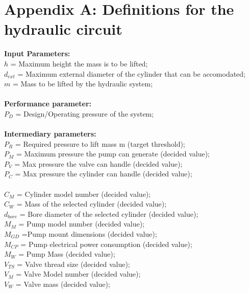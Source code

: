 
\footnotesize

\normalsize

\section*{Appendix A: Definitions for the hydraulic circuit}

\textbf{Input Parameters:}\\
$h$ =  Maximum height the mass is to be lifted;\\
$d_{ext}$ = Maximum external diameter of the cylinder that can be accomodated;\\
$m$ = Mass to be lifted by the hydraulic system;\\ \\

\textbf{Performance parameter:}\\
$P_{D}$ = Design/Operating pressure of the system;\\ \\

\textbf{Intermediary parameters:}\\
$P_{R}$ = Required pressure to lift mass m (target threshold);\\
$P_{M}$ = Maximum pressure the pump can generate (decided value);\\
$P_{V}$ = Max pressure the valve can handle  (decided value);\\
$P_{C}$ = Max pressure the cylinder can handle  (decided value);\\ \\
$C_{M}$ = Cylinder model number  (decided value);\\
$C_{W}$ = Mass of the selected cylinder  (decided value);\\
$d_{bore}$ =  Bore diameter of the selected cylinder (decided value);\\
$M_{M}$ = Pump model number  (decided value);\\
$M_{GD}$ =Pump mount dimensions  (decided value);\\
$M_{CP}$ = Pump electrical power consumption (decided value);\\
$M_{W}$ = Pump Mass  (decided value);\\
$V_{TS}$ = Valve thread size  (decided value);\\
$V_{M}$ = Valve Model number  (decided value);\\
$V_{W}$ = Valve mass  (decided value);\\

